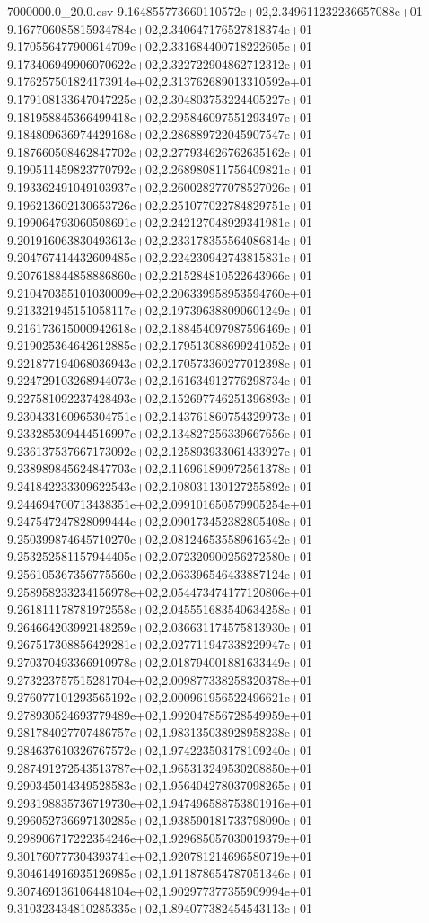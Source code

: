 \begin{filecontents*}{7000000.0_20.0.csv}
9.164855773660110572e+02,2.349611232236657088e+01
9.167706085815934784e+02,2.340647176527818374e+01
9.170556477900614709e+02,2.331684400718222605e+01
9.173406949906070622e+02,2.322722904862712312e+01
9.176257501824173914e+02,2.313762689013310592e+01
9.179108133647047225e+02,2.304803753224405227e+01
9.181958845366499418e+02,2.295846097551293497e+01
9.184809636974429168e+02,2.286889722045907547e+01
9.187660508462847702e+02,2.277934626762635162e+01
9.190511459823770792e+02,2.268980811756409821e+01
9.193362491049103937e+02,2.260028277078527026e+01
9.196213602130653726e+02,2.251077022784829751e+01
9.199064793060508691e+02,2.242127048929341981e+01
9.201916063830493613e+02,2.233178355564086814e+01
9.204767414432609485e+02,2.224230942743815831e+01
9.207618844858886860e+02,2.215284810522643966e+01
9.210470355101030009e+02,2.206339958953594760e+01
9.213321945151058117e+02,2.197396388090601249e+01
9.216173615000942618e+02,2.188454097987596469e+01
9.219025364642612885e+02,2.179513088699241052e+01
9.221877194068036943e+02,2.170573360277012398e+01
9.224729103268944073e+02,2.161634912776298734e+01
9.227581092237428493e+02,2.152697746251396893e+01
9.230433160965304751e+02,2.143761860754329973e+01
9.233285309444516997e+02,2.134827256339667656e+01
9.236137537667173092e+02,2.125893933061433927e+01
9.238989845624847703e+02,2.116961890972561378e+01
9.241842233309622543e+02,2.108031130127255892e+01
9.244694700713438351e+02,2.099101650579905254e+01
9.247547247828099444e+02,2.090173452382805408e+01
9.250399874645710270e+02,2.081246535589616542e+01
9.253252581157944405e+02,2.072320900256272580e+01
9.256105367356775560e+02,2.063396546433887124e+01
9.258958233234156978e+02,2.054473474177120806e+01
9.261811178781972558e+02,2.045551683540634258e+01
9.264664203992148259e+02,2.036631174575813930e+01
9.267517308856429281e+02,2.027711947338229947e+01
9.270370493366910978e+02,2.018794001881633449e+01
9.273223757515281704e+02,2.009877338258320378e+01
9.276077101293565192e+02,2.000961956522496621e+01
9.278930524693779489e+02,1.992047856728549959e+01
9.281784027707486757e+02,1.983135038928958238e+01
9.284637610326767572e+02,1.974223503178109240e+01
9.287491272543513787e+02,1.965313249530208850e+01
9.290345014349528583e+02,1.956404278037098265e+01
9.293198835736719730e+02,1.947496588753801916e+01
9.296052736697130285e+02,1.938590181733798090e+01
9.298906717222354246e+02,1.929685057030019379e+01
9.301760777304393741e+02,1.920781214696580719e+01
9.304614916935126985e+02,1.911878654787051346e+01
9.307469136106448104e+02,1.902977377355909994e+01
9.310323434810285335e+02,1.894077382454543113e+01

\end{filecontents*}
